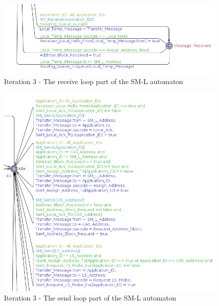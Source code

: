 \begin{figure}[ht]
    \centering
    \includegraphics[width=\textwidth]{figures/iteration3_sm_l_receive_loop}
    \caption{Iteration 3 - The receive loop part of the SM-L automaton}
    \label{fig:iteration3_sm_l_receive_loop}
\end{figure}

\begin{figure}[ht]
    \centering
    \includegraphics[width=\textwidth]{figures/iteration3_sm_l_send_loop}
    \caption{Iteration 3 - The send loop part of the SM-L automaton}
    \label{fig:iteration3_sm_l_send_loop}
\end{figure}


